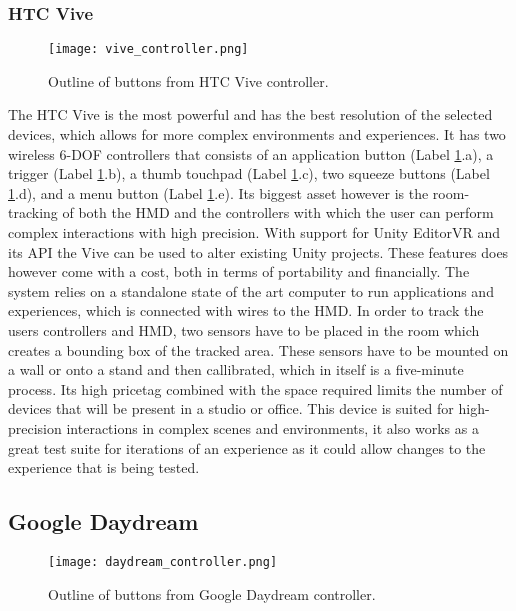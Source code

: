 \subsubsection{HTC Vive}
\label{result:hardware:vive}

\begin{figure}
  \centering
  \texttt{[image: vive\_controller.png]}
\caption{Outline of buttons from HTC Vive controller.}
\label{fig:result:hardware:vive:controller}
\end{figure}

The HTC Vive is the most powerful and has the best resolution of the selected devices, which allows for more complex environments and experiences. It has two wireless 6-DOF controllers that consists of an application button (Label \ref{fig:result:hardware:vive:controller}.a), a trigger (Label \ref{fig:result:hardware:vive:controller}.b), a thumb touchpad (Label \ref{fig:result:hardware:vive:controller}.c), two squeeze buttons (Label \ref{fig:result:hardware:vive:controller}.d),  and a menu button (Label \ref{fig:result:hardware:vive:controller}.e). Its biggest asset however is the room-tracking of both the HMD and the controllers with which the user can perform complex interactions with high precision. With support for Unity EditorVR and its API the Vive can be used to alter existing Unity projects.
These features does however come with a cost, both in terms of portability and financially. The system relies on a standalone state of the art computer to run applications and experiences, which is connected with wires to the HMD. In order to track the users controllers and HMD, two sensors have to be placed in the room which creates a bounding box of the tracked area. These sensors have to be mounted on a wall or onto a stand and then callibrated, which in itself is a five-minute process. Its high pricetag combined with the space required limits the number of devices that will be present in a studio or office.
This device is suited for high-precision interactions in complex scenes and environments, it also works as a great test suite for iterations of an experience as it could allow changes to the experience that is being tested.


\subsection{Google Daydream}

\begin{figure}
  \centering
  \texttt{[image: daydream\_controller.png]}
\caption{Outline of buttons from Google Daydream controller.}
\label{fig:result:hardware:daydream:controller}
\end{figure}

